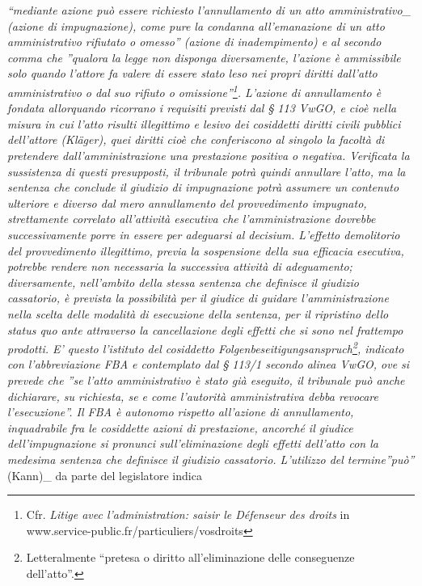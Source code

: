 \documentclass[12pt,it,a4paper,]{report}
\begin{document}
\emph{``mediante azione può essere richiesto l'annullamento di un atto
amministrativo\_ (azione di impugnazione), \emph{come pure la condanna
all'emanazione di un atto amministrativo rifiutato o omesso''} (azione
di inadempimento) e al secondo comma che \emph{''qualora la legge non
disponga diversamente, l'azione è ammissibile solo quando l'attore fa
valere di essere stato leso nei propri diritti dall'atto amministrativo
o dal suo rifiuto o omissione''}\footnote{Cfr. \emph{Litige avec
  l'administration: saisir le Défenseur des droits} in
  www.service-public.fr/particuliers/vosdroits}. L'azione di
annullamento è fondata allorquando ricorrano i requisiti previsti dal
\emph{§ 113 VwGO}, e cioè nella misura in cui l'atto risulti illegittimo
e lesivo dei cosiddetti diritti civili pubblici dell'attore
\emph{(Kläger)}, quei diritti cioè che conferiscono al singolo la
facoltà di pretendere dall'amministrazione una prestazione positiva o
negativa. Verificata la sussistenza di questi presupposti, il tribunale
potrà quindi annullare l'atto, ma la sentenza che conclude il giudizio
di impugnazione potrà assumere un contenuto ulteriore e diverso dal mero
annullamento del provvedimento impugnato, strettamente correlato
all'attività esecutiva che l'amministrazione dovrebbe successivamente
porre in essere per adeguarsi al \emph{decisium}. L'effetto demolitorio
del provvedimento illegittimo, previa la sospensione della sua efficacia
esecutiva, potrebbe rendere non necessaria la successiva attività di
adeguamento; diversamente, nell'ambito della stessa sentenza che
definisce il giudizio cassatorio, è prevista la possibilità per il
giudice di guidare l'amministrazione nella scelta delle modalità di
esecuzione della sentenza, per il ripristino dello \emph{status quo
ante} attraverso la cancellazione degli effetti che si sono nel
frattempo prodotti. E' questo l'istituto del cosiddetto
\emph{Folgenbeseitigungsanspruch}\footnote{Letteralmente ``pretesa o
  diritto all'eliminazione delle conseguenze dell'atto''.}, indicato con
l'abbreviazione \emph{FBA} e contemplato dal \emph{§ 113/1} secondo
alinea \emph{VwGO}, ove si prevede che \emph{''se l'atto amministrativo
è stato già eseguito, il tribunale può anche dichiarare, su richiesta,
se e come l'autorità amministrativa debba revocare l'esecuzione''}. Il
\emph{FBA} è autonomo rispetto all'azione di annullamento, inquadrabile
fra le cosiddette azioni di prestazione, ancorché il giudice
dell'impugnazione si pronunci sull'eliminazione degli effetti dell'atto
con la medesima sentenza che definisce il giudizio cassatorio.
L'utilizzo del termine''può'' }(Kann)\_ da parte del legislatore indica
\end{document}
